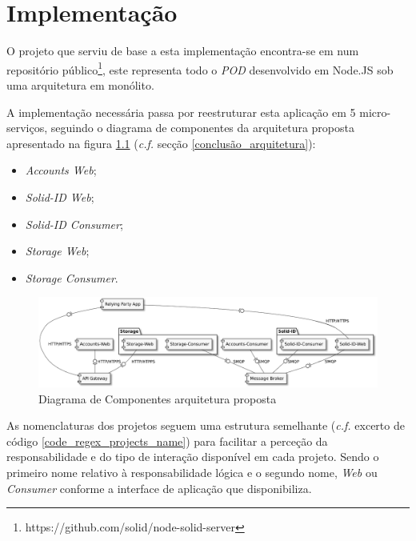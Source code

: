 
\chapter{Implementação}
\label{cap:5}

O projeto que serviu de base a esta implementação encontra-se em num repositório público\footnote{https://github.com/solid/node-solid-server}, este representa todo o \emph{\acrshort{POD}} desenvolvido em Node.JS sob uma arquitetura em monólito.

A implementação necessária passa por reestruturar esta aplicação em 5 micro-serviços, seguindo o diagrama de componentes da arquitetura proposta apresentado na figura \ref{implementacao_arquitetura_2_diagrama_componentes}  (\emph{c.f.} secção \ref{conclusão_arquitetura}):
\begin{itemize}
    \item \emph{Accounts Web};
    \item \emph{Solid-ID Web};
    \item \emph{Solid-ID Consumer};
    \item \emph{Storage Web};
    \item \emph{Storage Consumer}.
\end{itemize}

\begin{figure}[H]
    \begin{center}
    \includegraphics[width=1 \textwidth]{figures/arquitetura_2_diagrama_componentes.eps}
    \caption{Diagrama de Componentes arquitetura proposta}
    \label{implementacao_arquitetura_2_diagrama_componentes}
    \end{center}
\end{figure}

As nomenclaturas dos projetos seguem uma estrutura semelhante (\emph{c.f.} excerto de código \ref{code_regex_projects_name}) para facilitar a perceção da responsabilidade e do tipo de interação disponível em cada projeto. Sendo o primeiro nome relativo à responsabilidade lógica e o segundo nome, \emph{Web} ou \emph{Consumer} conforme a interface de aplicação que disponibiliza.

